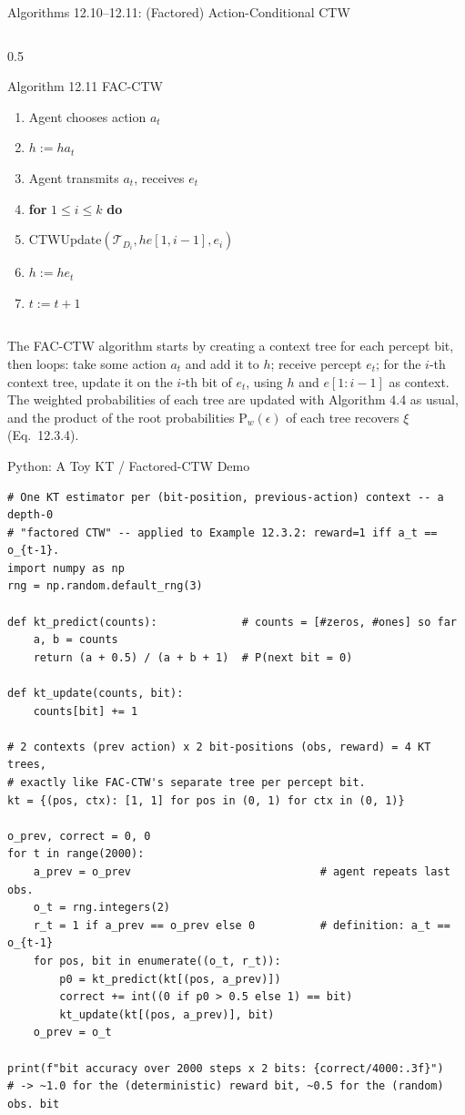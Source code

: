 \documentclass[aspectratio=169,10pt]{beamer}
\newcommand{\Tcal}{\mathcal{T}}
\begin{document}
\begin{frame}{Algorithms 12.10--12.11: (Factored) Action-Conditional CTW}
\begin{columns}[T]
\begin{column}{0.5\textwidth}
\begin{block}{Algorithm 12.11 FAC-CTW}
\begin{enumerate}
\item[5:] \quad Agent chooses action $a_t$
\item[6:] \quad $h:=ha_t$
\item[7:] \quad Agent transmits $a_t$, receives $e_t$
\item[8:] \quad \textbf{for} $1\le i\le k$ \textbf{do}
\item[9:] \qquad CTWUpdate$(\Tcal_{D_i},he[1,i{-}1],e_i)$
\item[10:] \quad $h:=he_t$
\item[11:] \quad $t:=t+1$
\end{enumerate}
\end{block}
\end{column}
\end{columns}
\vspace{0.2cm}
The FAC-CTW algorithm starts by creating a context tree for each percept bit, then loops:
take some action $a_t$ and add it to $h$; receive percept $e_t$; for the $i$-th context
tree, update it on the $i$-th bit of $e_t$, using $h$ and $e[1{:}i{-}1]$ as context. The
weighted probabilities of each tree are updated with Algorithm 4.4 as usual, and the
product of the root probabilities $\mathrm{P}_w(\epsilon)$ of each tree recovers $\xi$
(Eq.\ 12.3.4).
\end{frame}

\begin{frame}[fragile]{Python: A Toy KT / Factored-CTW Demo}
\vspace{-0.1cm}
{\lstset{basicstyle=\ttfamily\tiny}
\begin{lstlisting}
# One KT estimator per (bit-position, previous-action) context -- a depth-0
# "factored CTW" -- applied to Example 12.3.2: reward=1 iff a_t == o_{t-1}.
import numpy as np
rng = np.random.default_rng(3)

def kt_predict(counts):             # counts = [#zeros, #ones] so far
    a, b = counts
    return (a + 0.5) / (a + b + 1)  # P(next bit = 0)

def kt_update(counts, bit):
    counts[bit] += 1

# 2 contexts (prev action) x 2 bit-positions (obs, reward) = 4 KT trees,
# exactly like FAC-CTW's separate tree per percept bit.
kt = {(pos, ctx): [1, 1] for pos in (0, 1) for ctx in (0, 1)}

o_prev, correct = 0, 0
for t in range(2000):
    a_prev = o_prev                             # agent repeats last obs.
    o_t = rng.integers(2)
    r_t = 1 if a_prev == o_prev else 0          # definition: a_t == o_{t-1}
    for pos, bit in enumerate((o_t, r_t)):
        p0 = kt_predict(kt[(pos, a_prev)])
        correct += int((0 if p0 > 0.5 else 1) == bit)
        kt_update(kt[(pos, a_prev)], bit)
    o_prev = o_t

print(f"bit accuracy over 2000 steps x 2 bits: {correct/4000:.3f}")
# -> ~1.0 for the (deterministic) reward bit, ~0.5 for the (random) obs. bit
\end{lstlisting}}
\end{frame}
\end{document}
